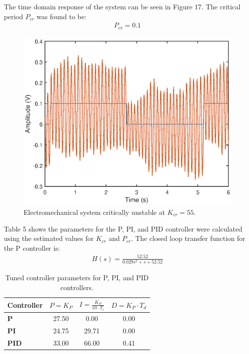 \documentclass{article}
\begin{document}
The time domain response of the system can be seen in Figure 17. The critical period $P_{cr}$ was found to be:
\begin{align*}
	P_{cr} = 0.1
\end{align*}

\begin{figure}[H]
	\centering
	\includegraphics[scale=0.5]{fig15}
	\caption{Electromechanical system critically unstable at $K_{cr} = 55$.}
\end{figure}

Table 5 shows the parameters for the P, PI, and PID controller were calculated using the estimated values for $K_{cr}$ and $P_{cr}$. The closed loop transfer function for the P controller is:
\begin{align}
	H(s) = \frac{52.52}{0.029s^2 + s +52.52}
\end{align}

 \begin{table}[H]
	\centering
	\caption{Tuned controller parameters for P, PI, and PID controllers.}
	\begin{tabular}{lccc}
		\toprule
		\textbf{Controller} & $P = K_P$ & $I = \frac{K_P}{10 \cdot T_i}$ & $D = K_P \cdot T_d$\\
		\midrule
		\textbf{P} & 27.50 & 0.00 & 0.00\\
		\textbf{PI} & 24.75 & 29.71 & 0.00\\
		\textbf{PID} & 33.00 & 66.00 & 0.41\\
		\bottomrule
	\end{tabular}
\end{table}
\end{document}
